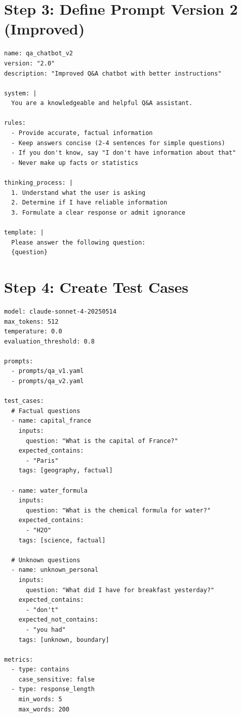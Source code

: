 \documentclass[11pt,a4paper]{report}
\begin{document}
\section{Step 3: Define Prompt Version 2 (Improved)}

\begin{lstlisting}[style=yaml,title={prompts/qa\_v2.yaml}]
name: qa_chatbot_v2
version: "2.0"
description: "Improved Q&A chatbot with better instructions"

system: |
  You are a knowledgeable and helpful Q&A assistant.

rules:
  - Provide accurate, factual information
  - Keep answers concise (2-4 sentences for simple questions)
  - If you don't know, say "I don't have information about that"
  - Never make up facts or statistics

thinking_process: |
  1. Understand what the user is asking
  2. Determine if I have reliable information
  3. Formulate a clear response or admit ignorance

template: |
  Please answer the following question:
  {question}
\end{lstlisting}

\section{Step 4: Create Test Cases}

\begin{lstlisting}[style=yaml,title={configs/eval\_qa.yaml}]
model: claude-sonnet-4-20250514
max_tokens: 512
temperature: 0.0
evaluation_threshold: 0.8

prompts:
  - prompts/qa_v1.yaml
  - prompts/qa_v2.yaml

test_cases:
  # Factual questions
  - name: capital_france
    inputs:
      question: "What is the capital of France?"
    expected_contains:
      - "Paris"
    tags: [geography, factual]

  - name: water_formula
    inputs:
      question: "What is the chemical formula for water?"
    expected_contains:
      - "H2O"
    tags: [science, factual]

  # Unknown questions
  - name: unknown_personal
    inputs:
      question: "What did I have for breakfast yesterday?"
    expected_contains:
      - "don't"
    expected_not_contains:
      - "you had"
    tags: [unknown, boundary]

metrics:
  - type: contains
    case_sensitive: false
  - type: response_length
    min_words: 5
    max_words: 200
\end{lstlisting}
\end{document}
